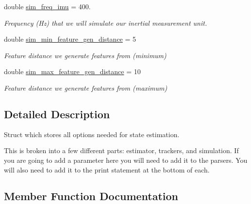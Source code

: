 \begin{DoxyCompactItemize}
\mbox{\label{structov__msckf_1_1VioManagerOptions_aaf63d79014853441849b5e6a2813020f}} 
double \hyperlink{structov__msckf_1_1VioManagerOptions_aaf63d79014853441849b5e6a2813020f}{sim\+\_\+freq\+\_\+imu} = 400.
\begin{DoxyCompactList}\small\item\em Frequency (Hz) that we will simulate our inertial measurement unit. \end{DoxyCompactList}\item 
\mbox{\label{structov__msckf_1_1VioManagerOptions_ae229dda22c11905a023f944f2b25842a}} 
double \hyperlink{structov__msckf_1_1VioManagerOptions_ae229dda22c11905a023f944f2b25842a}{sim\+\_\+min\+\_\+feature\+\_\+gen\+\_\+distance} = 5
\begin{DoxyCompactList}\small\item\em Feature distance we generate features from (minimum) \end{DoxyCompactList}\item 
\mbox{\label{structov__msckf_1_1VioManagerOptions_a2663dc7c331d58f45e1ce701211f68dc}} 
double \hyperlink{structov__msckf_1_1VioManagerOptions_a2663dc7c331d58f45e1ce701211f68dc}{sim\+\_\+max\+\_\+feature\+\_\+gen\+\_\+distance} = 10
\begin{DoxyCompactList}\small\item\em Feature distance we generate features from (maximum) \end{DoxyCompactList}\end{DoxyCompactItemize}


\subsection{Detailed Description}
Struct which stores all options needed for state estimation. 

This is broken into a few different parts\+: estimator, trackers, and simulation. If you are going to add a parameter here you will need to add it to the parsers. You will also need to add it to the print statement at the bottom of each. 

\subsection{Member Function Documentation}
\mbox{\label{structov__msckf_1_1VioManagerOptions_a47c23046d8d14887345655c41086a6be}} 

